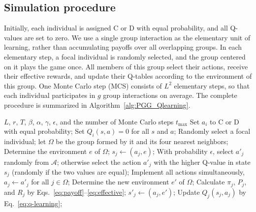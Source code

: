 \documentclass[%
  aip,cha,
  amsmath,amssymb,
  reprint,
  floatfix,
  article-title,
]{revtex4-2}
\begin{document}
\subsection{Simulation procedure}\label{sec:simulation}

Initially, each individual is assigned $\mathrm{C}$ or $\mathrm{D}$ with equal probability, and all Q-values are set to zero. We use a single group interaction as the elementary unit of learning, rather than accumulating payoffs over all overlapping groups.\cite{li2025environmental} In each elementary step, a focal individual is randomly selected, and the group centered on it plays the game once. All members of this group select their actions, receive their effective rewards, and update their Q-tables according to the environment of this group. One Monte Carlo step (MCS) consists of $L^2$ elementary steps, so that each individual participates in $g$ group interactions on average. The complete procedure is summarized in Algorithm~\ref{alg:PGG_Qlearning}.

\begin{algorithm}[H]
\caption{Spatial public goods game with peer pressure and Q-learning.}
\label{alg:PGG_Qlearning}
\begin{algorithmic}[1]
\REQUIRE $L$, $r$, $T$, $\beta$, $\alpha$, $\gamma$, $\epsilon$, and the number of Monte Carlo steps $t_{\max}$
    \STATE Set $a_i$ to $\mathrm{C}$ or $\mathrm{D}$ with equal probability;
    \STATE Set $Q_i(s,a)=0$ for all $s$ and $a$;
\ENDFOR
{}
        \STATE Randomly select a focal individual; let $\Omega$ be the group formed by it and its four nearest neighbors;
        \STATE Determine the environment $e$ of $\Omega$;
            \STATE $s_j\leftarrow(a_j,e)$;
            \STATE With probability $\epsilon$, select $a'_j$ randomly from $\mathcal{A}$; otherwise select the action $a'_j$ with the higher Q-value in state $s_j$ (randomly if the two values are equal);
        \ENDFOR
        \STATE Implement all actions simultaneously, $a_j\leftarrow a'_j$ for all $j\in\Omega$;
        \STATE Determine the new environment $e'$ of $\Omega$;
            \STATE Calculate $\pi_j$, $P_j$, and $R_j$ by Eqs.~\eqref{eq:payoff}--\eqref{eq:effective};
            \STATE $s'_j\leftarrow(a_j,e')$;
            \STATE Update $Q_j(s_j,a_j)$ by Eq.~\eqref{eq:q-learning};
        \ENDFOR
    \ENDFOR
\ENDFOR
\end{algorithmic}
\end{algorithm}
\end{document}
